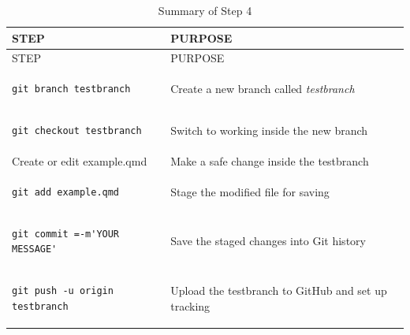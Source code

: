 \documentclass[
  11pt,
  a4paper,
]{article}
\begin{document}
\begin{longtable}[]{@{}
  >{\raggedright\arraybackslash}p{}
  >{\raggedright\arraybackslash}p{}@{}}
\caption{Summary of Step 4}\tabularnewline
\toprule\noalign{}
\begin{minipage}[b]{\linewidth}\raggedright
STEP
\end{minipage} & \begin{minipage}[b]{\linewidth}\raggedright
PURPOSE
\end{minipage} \\
\midrule\noalign{}
\endfirsthead
\toprule\noalign{}
\begin{minipage}[b]{\linewidth}\raggedright
STEP
\end{minipage} & \begin{minipage}[b]{\linewidth}\raggedright
PURPOSE
\end{minipage} \\
\midrule\noalign{}
\endhead
\bottomrule\noalign{}
\endlastfoot
\begin{minipage}[t]{\linewidth}\raggedright
\begin{verbatim}
git branch testbranch
\end{verbatim}
\end{minipage} & Create a new branch called \emph{testbranch} \\
\begin{minipage}[t]{\linewidth}\raggedright
\begin{verbatim}
git checkout testbranch
\end{verbatim}
\end{minipage} & Switch to working inside the new branch \\
Create or edit example.qmd & Make a safe change inside the testbranch \\
\begin{minipage}[t]{\linewidth}\raggedright
\begin{verbatim}
git add example.qmd
\end{verbatim}
\end{minipage} & Stage the modified file for saving \\
\begin{minipage}[t]{\linewidth}\raggedright
\begin{verbatim}
git commit =-m'YOUR MESSAGE'
\end{verbatim}
\end{minipage} & Save the staged changes into Git history \\
\begin{minipage}[t]{\linewidth}\raggedright
\begin{verbatim}
git push -u origin testbranch
\end{verbatim}
\end{minipage} & Upload the testbranch to GitHub and set up tracking \\
\end{longtable}
\end{document}
